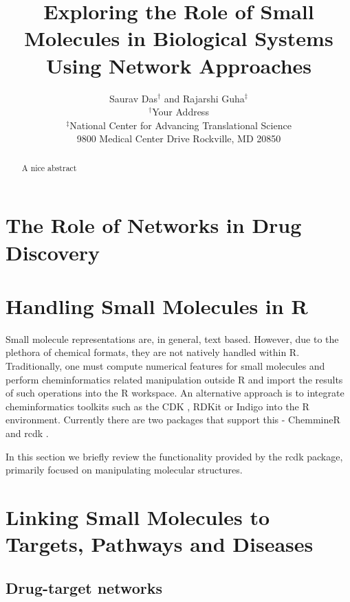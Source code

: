 \documentclass[12pt,letterpaper]{article}
\begin{document}
\title{Exploring the Role of Small Molecules in Biological Systems Using Network Approaches}
\author{Saurav Das$^\dagger$ and Rajarshi Guha$^\ddagger$\\
$^\dagger$Your Address \\
$^\ddagger$National Center for Advancing Translational Science \\ 9800 Medical Center Drive  Rockville, MD 20850}
\date{}

\maketitle
\begin{abstract}
A nice abstract
\end{abstract}

\section{The Role of Networks in Drug Discovery}
\label{sec:role-networks-drug}

\section{Handling Small Molecules in R}
\label{sec:handl-small-molec}

Small molecule representations are, in general, text based. However,
due to the plethora of chemical formats, they are not natively handled
within R.  Traditionally, one must compute numerical features for
small molecules and perform cheminformatics related manipulation
outside R and import the results of such operations into the R
workspace. An alternative approach is to integrate cheminformatics
toolkits such as the CDK \cite{Steinbeck:2003bh}, RDKit or Indigo into
the R environment. Currently there are two packages that support this
- ChemmineR \cite{Cao:2008fj} and rcdk \cite{Guha:2007aa}.

In this section we briefly review the functionality provided by the
rcdk package, primarily focused on manipulating molecular structures.

\section{Linking Small Molecules to Targets, Pathways and Diseases}
\label{sec:link-small-molec}

\subsection{Drug-target networks}
\label{sec:drug-target-networks}
\end{document}
